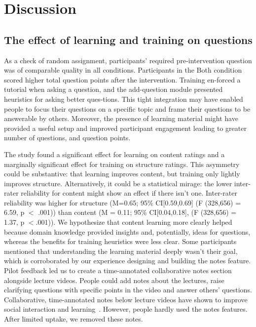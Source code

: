 \section{Discussion}
\subsection{The effect of learning and training on questions}
As a check of random assignment, participants’ required pre-intervention question was of comparable quality in all conditions. Participants in the Both condition scored higher total question points after the intervention. Training en-forced a tutorial when asking a question, and the add-question module presented heuristics for asking better ques-tions. This tight integration may have enabled people to focus their questions on a specific topic and frame their questions to be answerable by others. Moreover, the presence of learning material might have provided a useful setup and improved participant engagement leading to greater number of questions, and question points.

The study found a significant effect for learning on content ratings and a marginally significant effect for training on structure ratings. This asymmetry could be substantive: that learning improves content, but training only lightly improves structure. Alternatively, it could be a statistical mirage: the lower inter-rater reliability for content might show an effect if there isn’t one. Inter-rater reliability was higher for structure (M=0.65; 95\% CI[0.59,0.69] (F (328,656) = 6.59, p $<$ .001)) than content (M = 0.11; 95\% CI[0.04,0.18], (F (328,656) = 1.37, p $<$.001)).
We hypothesize that content learning more clearly helped because domain knowledge provided insights and, potentially, ideas for questions, whereas the benefits for training heuristics were less clear. Some participants mentioned that understanding the learning material deeply wasn’t their goal, which is corroborated by our experience designing and building the notes feature. Pilot feedback led us to create a time-annotated collaborative notes section alongside lecture videos. People could add notes about the lectures, raise clarifying questions with specific points in the video and answer others’ questions. Collaborative, time-annotated notes below lecture videos have shown to improve social interaction and learning~\cite{Lee2015}. However, people hardly used the notes features. After limited uptake, we removed these notes.

